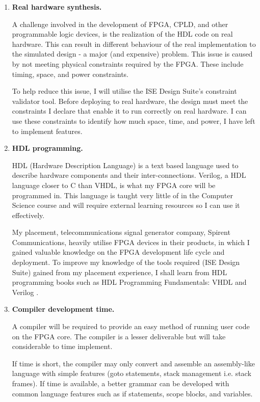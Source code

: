 \begin{enumerate}[label=\bfseries R\arabic*]
\item{
\textbf{Real hardware synthesis. }

A challenge involved in the development of FPGA, CPLD, and other programmable logic devices, is the realization of the HDL code on real hardware. This can result in different behaviour of the real implementation to the simulated design - a major (and expensive) problem. This issue is caused by not meeting physical constraints required by the FPGA. These include timing, space, and power constraints.

To help reduce this issue, I will utilise the ISE Design Suite's constraint validator tool. Before deploying to real hardware, the design must meet the constraints I declare that enable it to run correctly on real hardware. I can use these constraints to identify how much space, time, and power, I have left to implement features.
}\label{risk:hw}
\item{
\textbf{HDL programming.} 

HDL (Hardware Description Language) is a text based language used to describe hardware components and their inter-connections. Verilog, a HDL language closer to C than VHDL, is what my FPGA core will be programmed in. This language is taught very little of in the Computer Science course and will require external learning resources so I can use it effectively. 

My placement,  telecommunications signal generator company, Spirent Communications, heavily utilise FPGA devices in their products, in which I gained valuable knowledge on the FPGA development life cycle and deployment. To improve my knowledge of the tools required (ISE Design Suite) gained from my placement experience, I shall learn from HDL programming books such as HDL Programming Fundamentals: VHDL and Verilog \citep{hdl}.
}

\item{\textbf{Compiler development time. }

A compiler will be required to provide an easy method of running user code on the FPGA core. The compiler is a lesser deliverable but will take considerable to time implement.

If time is short, the compiler may only convert and assemble an assembly-like language with simple features (goto statements, stack management i.e. stack frames). If time is available, a better grammar can be developed with common language features such as if statements, scope blocks, and variables.

}
\end{enumerate}
